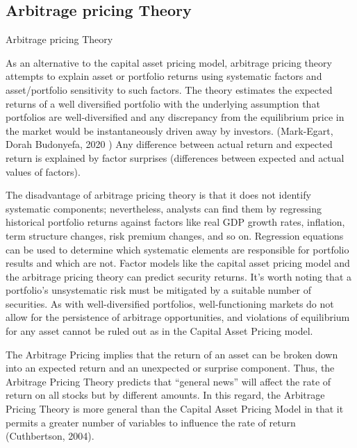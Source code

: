 \documentclass[unknownkeysallowed, compress]{beamer}
\theoremstyle{plain}
\begin{document}
\subsection{Arbitrage pricing Theory}
\begin{frame}[allowframebreaks]{Arbitrage pricing Theory}

\noindent
\par As an alternative to the capital asset pricing
model, arbitrage pricing theory attempts to explain asset or portfolio returns using
systematic factors and asset/portfolio sensitivity to such factors. The theory estimates
the expected returns of a well diversified portfolio with the underlying assumption that
portfolios are well-diversified and any discrepancy from the equilibrium price in the
market would be instantaneously driven away by investors. (Mark-Egart, Dorah
Budonyefa, 2020 ) Any difference between actual return and expected return is explained
by factor surprises (differences between expected and actual values of factors).\\

\par The disadvantage of arbitrage pricing theory is that it does not identify systematic
components; nevertheless, analysts can find them by regressing historical portfolio
returns against factors like real GDP growth rates, inflation, term structure changes, risk
premium changes, and so on. Regression equations can be used to determine which
systematic elements are responsible for portfolio results and which are not. Factor
models like the capital asset pricing model and the arbitrage pricing theory can predict
security returns. It's worth noting that a portfolio's unsystematic risk must be mitigated
by a suitable number of securities. As with well-diversified portfolios, well-functioning
markets do not allow for the persistence of arbitrage opportunities, and violations of
equilibrium for any asset cannot be ruled out as in the Capital Asset Pricing model.\\

\par The Arbitrage Pricing implies that the return of an asset can be broken down into an
expected return and an unexpected or surprise component. Thus, the Arbitrage Pricing
Theory predicts that ``general news'' will affect the rate of return on all stocks but by
different amounts. In this regard, the Arbitrage Pricing Theory is more general than the
Capital Asset Pricing Model in that it permits a greater number of variables to influence
the rate of return (Cuthbertson, 2004).
\end{frame}
\end{document}

